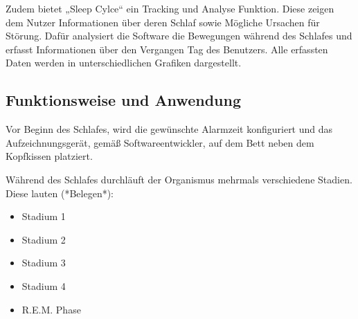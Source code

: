 Zudem bietet „Sleep Cylce“ ein Tracking und Analyse Funktion.
Diese zeigen dem Nutzer Informationen über deren Schlaf sowie Mögliche Ursachen für Störung.
Dafür analysiert die Software die Bewegungen während des Schlafes und erfasst Informationen über den Vergangen Tag des Benutzers.
Alle erfassten Daten werden in unterschiedlichen Grafiken dargestellt.




\subsection{Funktionsweise und Anwendung}
\label{ch:Apps:sec:Sleepcycle:subsec:FuA}

Vor Beginn des Schlafes, wird die gewünschte Alarmzeit konfiguriert und das Aufzeichnungsgerät, gemäß Softwareentwickler, auf dem Bett neben dem Kopfkissen platziert. 

Während des Schlafes durchläuft der Organismus mehrmals verschiedene Stadien. Diese lauten (*Belegen*):

\begin{itemize}
	\item Stadium 1
	\item Stadium 2
	\item Stadium 3
	\item Stadium 4
	\item R.E.M. Phase
\end{itemize}


